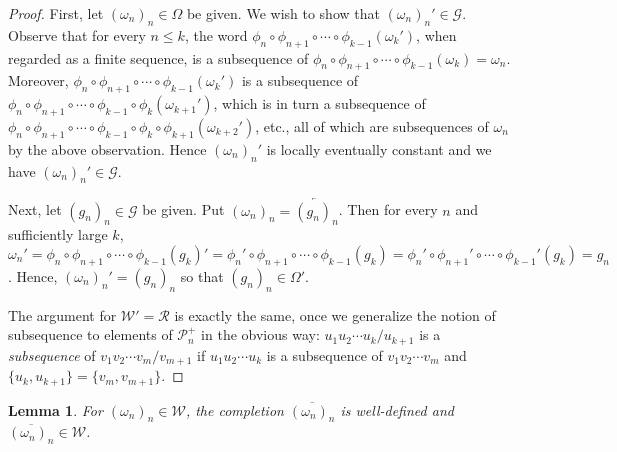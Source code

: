 \documentclass{amsart}
\newtheorem{lemma}[theorem]{Lemma}
\theoremstyle{definition}
\theoremstyle{remark}
\numberwithin{equation}{section}
\begin{document}
\begin{proof}
First, let $(\omega_n)_n\in \Omega$ be given. We wish to show that $(\omega_n)_n'\in {\mathcal G}$.
Observe that for every $n\leqslant k$,  the word $\phi_n\circ \phi_{n+1}\circ\cdots\circ \phi_{k-1}(\omega_k')$, when regarded as a finite sequence, is a subsequence of $\phi_n\circ \phi_{n+1}\circ\cdots\circ \phi_{k-1}(\omega_k)=\omega_n$. Moreover, $\phi_n\circ \phi_{n+1}\circ\cdots\circ \phi_{k-1}(\omega_k')$ is a subsequence of $\phi_n\circ \phi_{n+1}\circ\cdots\circ \phi_{k-1}\circ\phi_k(\omega_{k+1}')$, which is in turn a subsequence of
$\phi_n\circ \phi_{n+1}\circ\cdots\circ \phi_{k-1}\circ\phi_k\circ \phi_{k+1}(\omega_{k+2}')$, etc., all of which are  subsequences of $\omega_n$ by the above observation. Hence $(\omega_n)_n'$ is locally eventually constant and we have $(\omega_n)_n'\in {\mathcal G}$.

Next, let $(g_n)_n\in {\mathcal G}$ be given. Put $(\omega_n)_n=\overleftarrow{(g_n)_n}$. Then for every $n$ and sufficiently large $k$, $\omega_n'=\phi_n\circ \phi_{n+1}\circ \cdots\circ \phi_{k-1}(g_k)'=\phi_n'\circ \phi_{n+1}\circ \cdots\circ \phi_{k-1}(g_k)=\phi_n'\circ \phi_{n+1}'\circ \cdots\circ \phi_{k-1}'(g_k)=g_n$. Hence, $(\omega_n)_n'=(g_n)_n$ so that $(g_n)_n\in \Omega'$.

 The argument for ${\mathcal W}'={\mathcal R}$ is exactly the same, once we generalize the notion of subsequence to elements of ${\mathcal P}_n^+$ in the obvious way: $u_1u_2\cdots u_k/u_{k+1}$ is a {\em subsequence} of $v_1v_2\cdots v_m/v_{m+1}$ if $u_1u_2\cdots u_k$ is a subsequence of $v_1v_2\cdots v_m$ and $\{u_k,u_{k+1}\}=\{v_m,v_{m+1}\}$.
\end{proof}

\begin{lemma}\label{completion}
For $(\omega_n)_n\in {\mathcal W}$, the completion $\overline{(\omega_n)_n}$  is well-defined and $\overline{(\omega_n)_n}\in\mathcal W$.
\end{lemma}
\end{document}
